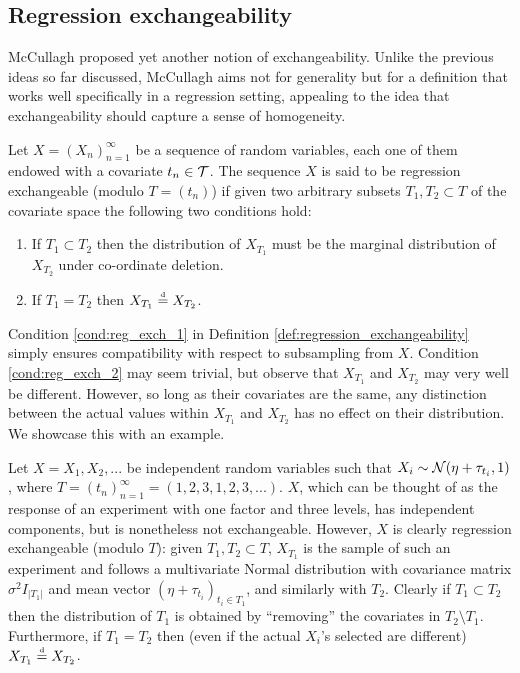 \subsection{Regression exchangeability}



McCullagh \cite{McCullagh:2005:ExchAndReg} proposed yet another notion of exchangeability. Unlike the previous ideas so far discussed, McCullagh aims not for generality but for a definition that works well specifically in a regression setting, appealing to the idea that exchangeability should capture a sense of homogeneity.

\begin{definition}	\label{def:regression_exchangeability}
	Let $X = (X_n)_{n=1}^{\infty}$ be a sequence of random variables, each one of them endowed with a covariate $t_n \in \mathcal{T}$. The sequence $X$ is said to be regression exchangeable (modulo $T = (t_n)$) if given two arbitrary subsets $T_1, T_2 \subset T$ of the covariate space the following two conditions hold:
	\begin{enumerate}
		\item If $T_1 \subset T_2$ then the distribution of $X_{T_1}$ must be the marginal distribution of $X_{T_2}$ under co-ordinate deletion. \label{cond:reg_exch_1}
		\item If $T_1 = T_2$ then $X_{T_1} \stackrel{\text{\rm\tiny d}}{=} X_{T_2}$. \label{cond:reg_exch_2}
	\end{enumerate}
\end{definition}


Condition \ref{cond:reg_exch_1} in Definition \ref{def:regression_exchangeability} simply ensures compatibility with respect to subsampling from $X$. Condition \ref{cond:reg_exch_2} may seem trivial, but observe that $X_{T_1}$ and $X_{T_2}$ may very well be different. However, so long as their covariates are the same, any distinction between the actual values within $X_{T_1}$ and $X_{T_2}$ has no effect on their distribution. We showcase this with an example.



\begin{mdframed}[backgroundcolor=mygray] 
	\begin{example} \label{ex:reg_exch_1}
		Let $X = X_1, X_2, ...$ be independent random variables such that $X_i \sim \mathcal{N} (\eta + \tau_{t_i}, 1)$, where $T = (t_n)_{n=1}^{\infty} = (1, 2, 3, 1, 2, 3, ...)$. $X$, which can be thought of as the response of an experiment with one factor and three levels, has independent components, but is nonetheless not exchangeable. However, $X$ is clearly regression exchangeable (modulo $T$): given $T_1, T_2 \subset T$, $X_{T_1}$ is the sample of such an experiment and follows a multivariate Normal distribution with covariance matrix $\sigma^2 I_{|T_1|}$ and mean vector $(\eta + \tau_{t_i})_{t_i \in T_1}$, and similarly with $T_2$. Clearly if $T_1 \subset T_2$ then the distribution of $T_1$ is obtained by ``removing'' the covariates in $T_2 \setminus T_1$. Furthermore, if $T_1 = T_2$ then (even if the actual $X_i$'s selected are different) $X_{T_1} \stackrel{\text{\rm\tiny d}}{=} X_{T_2}$.
	\end{example}
\end{mdframed}


